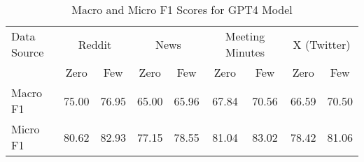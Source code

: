 \begin{table}[htbp]
\centering
\begin{tabular}{l *{8}{c}}
\toprule
Data Source & \multicolumn{2}{c}{Reddit} & \multicolumn{2}{c}{News} & \multicolumn{2}{c}{Meeting Minutes} & \multicolumn{2}{c}{X (Twitter)} \\
& Zero & Few & Zero & Few & Zero & Few & Zero & Few \\
\midrule
Macro F1 & 75.00 & 76.95 & 65.00 & 65.96 & 67.84 & 70.56 & 66.59 & 70.50 \\
Micro F1 & 80.62 & 82.93 & 77.15 & 78.55 & 81.04 & 83.02 & 78.42 & 81.06 \\
\bottomrule
\end{tabular}
\centering\caption{Macro and Micro F1 Scores for GPT4 Model}
\label{tab:gpt4_macro_micro}
\end{table}